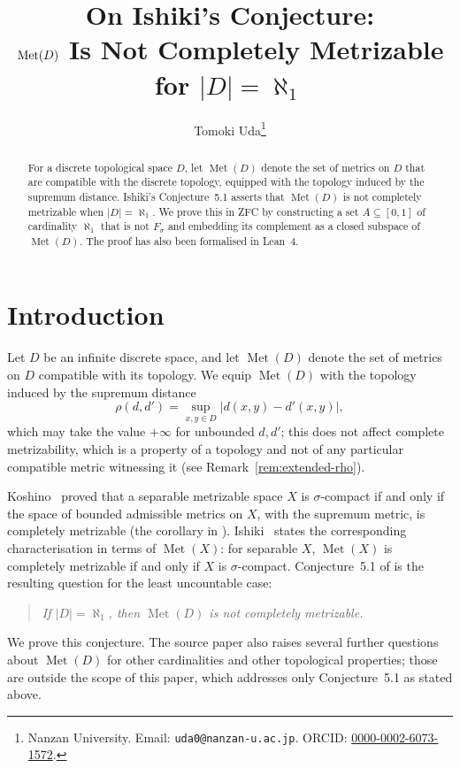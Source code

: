 \documentclass[12pt]{article}
\title{On Ishiki's Conjecture:\\
       $\Met(D)$ Is Not Completely Metrizable for
       $\lvert D\rvert=\aleph_1$}
\author{Tomoki Uda\thanks{Nanzan University.
  Email: \texttt{uda0@nanzan-u.ac.jp}.
  ORCID: \href{https://orcid.org/0000-0002-6073-1572}{0000-0002-6073-1572}.}}
\date{}
\theoremstyle{definition}
\newcommand{\Met}{\operatorname{Met}}
\newcommand{\Fsigma}{F_{\!\sigma}}
\begin{document}
\maketitle

\begin{abstract}
  For a discrete topological space $D$, let $\Met(D)$ denote the set of
  metrics on $D$ that are compatible with the discrete topology, equipped
  with the topology induced by the supremum distance. Ishiki's
  Conjecture~5.1 asserts that $\Met(D)$ is not completely metrizable when
  $\lvert D\rvert = \aleph_1$. We prove this in ZFC by constructing a
  set $A \subseteq [0,1]$ of cardinality $\aleph_1$ that is not
  $\Fsigma$ and embedding its complement as a closed subspace of $\Met(D)$.
  The proof has also been formalised in Lean~4.
\end{abstract}

\section{Introduction}
\label{sec:intro}

Let $D$ be an infinite discrete space, and let $\Met(D)$ denote the set
of metrics on $D$ compatible with its topology. We equip $\Met(D)$ with
the topology induced by the supremum distance
\[
  \rho(d, d') = \sup_{x,y\in D} \lvert d(x,y) - d'(x,y)\rvert ,
\]
which may take the value $+\infty$ for unbounded $d,d'$; this does not
affect complete metrizability, which is a property of a topology and not
of any particular compatible metric witnessing it (see
Remark~\ref{rem:extended-rho}).

Koshino~\cite{Koshino2024} proved that a separable metrizable space $X$
is $\sigma$-compact if and only if the space of bounded admissible
metrics on $X$, with the supremum metric, is completely metrizable (the
corollary in \cite{Koshino2024}). Ishiki~\cite{Ishiki2024} states the
corresponding characterisation in terms of $\Met(X)$: for separable $X$,
$\Met(X)$ is completely metrizable if and only if $X$ is $\sigma$-compact.
Conjecture~5.1 of \cite{Ishiki2024} is the
resulting question for the least uncountable case:

\begin{quote}
  \emph{If $\lvert D\rvert = \aleph_1$, then $\Met(D)$ is not completely
  metrizable.}
\end{quote}

We prove this conjecture. The source paper also
raises several further questions about $\Met(D)$ for other cardinalities
and other topological properties; those are outside the scope of this
paper, which addresses only Conjecture~5.1 as stated above.
\end{document}
